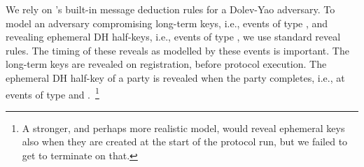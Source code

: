 We rely on \mTamarin's{} built-in message deduction rules for a Dolev-Yao adversary.
%
To model an adversary compromising long-term keys, i.e., events of type
\mRevLTK{}, and revealing ephemeral DH half-keys, i.e., events of type
\mRevEph{}, we use standard reveal rules.
%
%
The timing of these reveals as modelled by these events is important. The long-term keys are revealed on registration, before protocol execution.
%
The ephemeral DH half-key of a party is revealed when the party completes, i.e.,
at events of type \mIComplete{} and \mRComplete.~\footnote{A stronger, and perhaps more realistic model, would reveal ephemeral keys also when they are
created at the start of the protocol run, but we failed to get \mTamarin{} to
terminate on that.}
%


